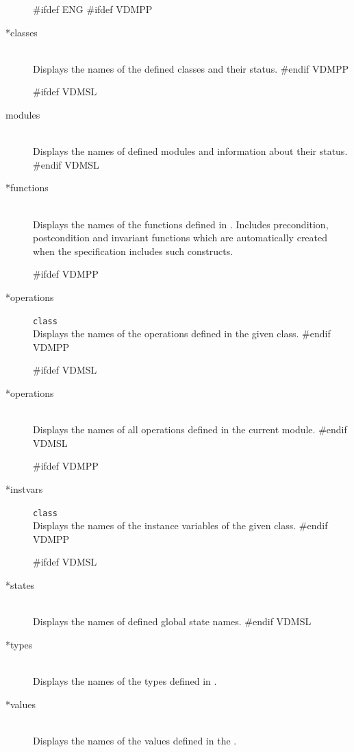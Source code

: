 \documentclass[\pformat,12pt]{article}
\begin{document}
\begin{description}

#ifdef ENG
#ifdef VDMPP
\item[*classes] \mbox{} \\
  Displays the names of the defined classes and their status.
#endif VDMPP

#ifdef VDMSL
\item[modules] \mbox{}\\
  Displays the names of defined modules and information about their
  status.
#endif VDMSL

\item[*functions]  \mbox{}\\ 
  Displays the names of the functions defined in
  .
  Includes precondition, postcondition and invariant functions which are
  automatically created when the specification includes such constructs.

#ifdef VDMPP
\item[*operations] {\tt class}\mbox{}\\
  Displays the names of  the operations defined in the given class.
#endif VDMPP

#ifdef VDMSL
\item[*operations] \mbox{}\\
  Displays the names of all operations defined in the current module.
#endif VDMSL

#ifdef VDMPP
\item[*instvars] {\tt class}\mbox{}\\
  Displays the names of the instance variables of the given class.
#endif VDMPP
  
#ifdef VDMSL
\item[*states]\mbox{}\\
  Displays the names of defined global state names.
#endif VDMSL

\item[*types] \mbox{}\\ 
  Displays the names of the types defined in
  .

\item[*values] \mbox{}\\ 
  Displays the names of the values defined in the 
  .


\end{description}
\end{document}
